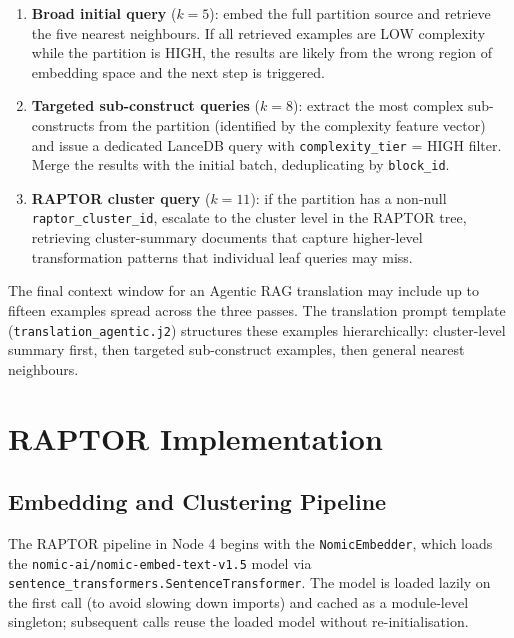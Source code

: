 \begin{enumerate}
  \item \textbf{Broad initial query} ($k=5$): embed the full partition source
    and retrieve the five nearest neighbours. If all retrieved examples are LOW
    complexity while the partition is HIGH, the results are likely from the wrong
    region of embedding space and the next step is triggered.
  \item \textbf{Targeted sub-construct queries} ($k=8$): extract the most
    complex sub-constructs from the partition (identified by the complexity
    feature vector) and issue a dedicated LanceDB query with
    \texttt{complexity\_tier} = HIGH filter. Merge the results with the
    initial batch, deduplicating by \texttt{block\_id}.
  \item \textbf{RAPTOR cluster query} ($k=11$): if the partition has a non-null
    \texttt{raptor\_cluster\_id}, escalate to the cluster level in the RAPTOR
    tree, retrieving cluster-summary documents that capture higher-level
    transformation patterns that individual leaf queries may miss.
\end{enumerate}

The final context window for an Agentic RAG translation may include up to fifteen
examples spread across the three passes. The translation prompt template
(\texttt{translation\_agentic.j2}) structures these examples hierarchically:
cluster-level summary first, then targeted sub-construct examples, then general
nearest neighbours.

\section{RAPTOR Implementation}
\label{sec:raptor-impl}

\subsection{Embedding and Clustering Pipeline}
\label{subsec:embedding-clustering}

The RAPTOR pipeline in Node 4 begins with the \texttt{NomicEmbedder}, which
loads the \texttt{nomic-ai/nomic-embed-text-v1.5} model via
\texttt{sentence\_transformers.SentenceTransformer}. The model is loaded lazily
on the first call (to avoid slowing down imports) and cached as a module-level
singleton; subsequent calls reuse the loaded model without re-initialisation.

